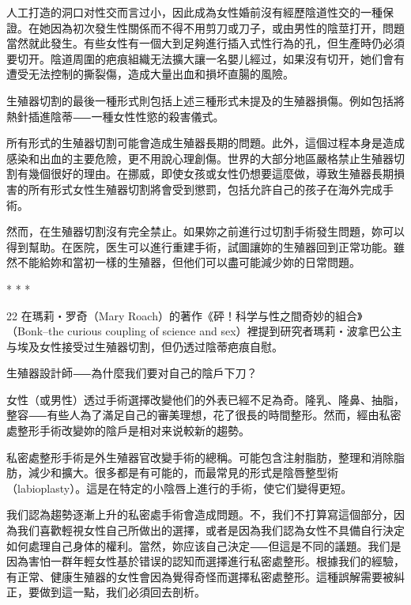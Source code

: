 \documentclass[12pt,UTF8]{ctexbook}
\begin{document}
人工打造的洞口对性交而言过小，因此成為女性婚前沒有經歷陰道性交的一種保證。在她因為初次發生性關係而不得不用剪刀或刀子，或由男性的陰莖打开，問題當然就此發生。有些女性有一個大到足夠進行插入式性行為的孔，但生產時仍必須要切开。陰道周圍的疤痕組織无法擴大讓一名嬰儿經过，如果沒有切开，她们會有遭受无法控制的撕裂傷，造成大量出血和損坏直腸的風險。

生殖器切割的最後一種形式則包括上述三種形式未提及的生殖器損傷。例如包括將熱針插進陰蒂⸺一種女性性慾的殺害儀式。

所有形式的生殖器切割可能會造成生殖器長期的問題。此外，這個过程本身是造成感染和出血的主要危險，更不用說心理創傷。世界的大部分地區嚴格禁止生殖器切割有幾個很好的理由。在挪威，即使女孩或女性仍想要這麼做，導致生殖器長期損害的所有形式女性生殖器切割將會受到懲罰，包括允許自己的孩子在海外完成手術。

然而，在生殖器切割沒有完全禁止。如果妳之前進行过切割手術發生問題，妳可以得到幫助。在医院，医生可以進行重建手術，試圖讓妳的生殖器回到正常功能。雖然不能給妳和當初一樣的生殖器，但他们可以盡可能減少妳的日常問題。





* * *



22	在瑪莉‧罗奇（Mary Roach）的著作《砰！科学与性之間奇妙的組合》（Bonk–the curious coupling of science and sex）裡提到研究者瑪莉‧波拿巴公主与埃及女性接受过生殖器切割，但仍透过陰蒂疤痕自慰。





生殖器設計師⸺為什麼我们要对自己的陰戶下刀？




女性（或男性）透过手術選擇改變他们的外表已經不足為奇。隆乳、隆鼻、抽脂，整容⸺有些人為了滿足自己的審美理想，花了很長的時間整形。然而，經由私密處整形手術改變妳的陰戶是相对来说較新的趨勢。

私密處整形手術是外生殖器官改變手術的總稱。可能包含注射脂肪，整理和消除脂肪，減少和擴大。很多都是有可能的，而最常見的形式是陰唇整型術（labioplasty）。這是在特定的小陰唇上進行的手術，使它们變得更短。

我们認為趨勢逐漸上升的私密處手術會造成問題。不，我们不打算寫這個部分，因為我们喜歡輕視女性自己所做出的選擇，或者是因為我们認為女性不具備自行決定如何處理自己身体的權利。當然，妳应该自己決定⸺但這是不同的議題。我们是因為害怕一群年輕女性基於错误的認知而選擇進行私密處整形。根據我们的經驗，有正常、健康生殖器的女性會因為覺得奇怪而選擇私密處整形。這種誤解需要被糾正，要做到這一點，我们必須回去剖析。
\end{document}
